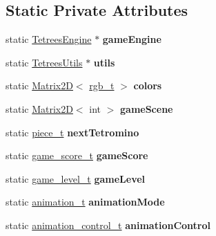 \subsection*{Static Private Attributes}
\begin{DoxyCompactItemize}
\item 
\mbox{\label{classTetreesUI_a07faa56ea40b28beba7509fa7f65c897}} 
static \hyperlink{classTetreesEngine}{Tetrees\+Engine} $\ast$ {\bfseries game\+Engine}
\item 
\mbox{\label{classTetreesUI_a80545840b2848938d01d7f85786ee141}} 
static \hyperlink{classTetreesUtils}{Tetrees\+Utils} $\ast$ {\bfseries utils}
\item 
\mbox{\label{classTetreesUI_a57300c1925cb5ae34c9220cd993e28b2}} 
static \hyperlink{classMatrix2D}{Matrix2D}$<$ \hyperlink{structrgb__t}{rgb\+\_\+t} $>$ {\bfseries colors}
\item 
\mbox{\label{classTetreesUI_a604cf4cecdbc93745eaf7733b3c33602}} 
static \hyperlink{classMatrix2D}{Matrix2D}$<$ int $>$ {\bfseries game\+Scene}
\item 
\mbox{\label{classTetreesUI_a6296ce8f3cde853cec110718c4b88540}} 
static \hyperlink{structpiece__t}{piece\+\_\+t} {\bfseries next\+Tetromino}
\item 
\mbox{\label{classTetreesUI_a128491041c6b77acec829fb5b1f4dafb}} 
static \hyperlink{structgame__score__t}{game\+\_\+score\+\_\+t} {\bfseries game\+Score}
\item 
\mbox{\label{classTetreesUI_a700b75dbee9c324c69a18f34c5efdab9}} 
static \hyperlink{structgame__level__t}{game\+\_\+level\+\_\+t} {\bfseries game\+Level}
\item 
\mbox{\label{classTetreesUI_af3bd9b55da30d2b324c2dfe2d740d8a2}} 
static \hyperlink{TetreesDefs_8hpp_a10487f3bfa31fd7b7b8c20f403f8c947}{animation\+\_\+t} {\bfseries animation\+Mode}
\item 
\mbox{\label{classTetreesUI_a06df6e44abd5d521448cf1299433b55c}} 
static \hyperlink{structanimation__control__t}{animation\+\_\+control\+\_\+t} {\bfseries animation\+Control}
\end{DoxyCompactItemize}


